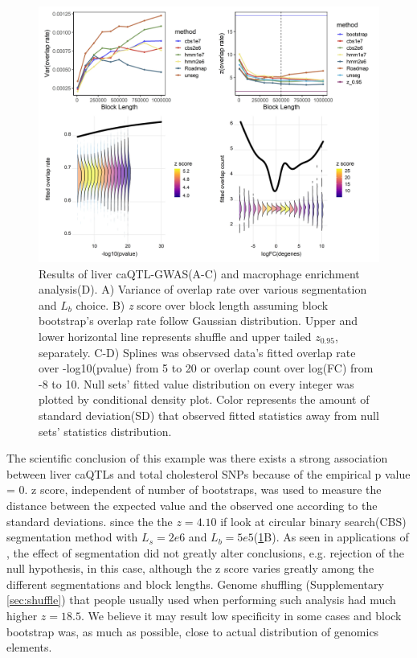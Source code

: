 \begin{figure}[hbtp]
\centering%
\setlength{\abovecaptionskip}{-0.1cm}
\setlength{\belowcaptionskip}{-0.1cm}
\includegraphics[scale=0.25]{Figures/fig2.jpeg}
\caption{Results of liver caQTL-GWAS(A-C) and macrophage enrichment analysis(D). A) Variance of overlap rate over various segmentation and $L_b$ choice. B) {\it z} score over block length assuming block bootstrap's overlap rate follow Gaussian distribution. Upper and lower horizontal line represents shuffle and upper tailed $z_{0.95}$, separately. C-D) Splines was observsed data's fitted overlap rate over -log10(pvalue) from 5 to 20 or overlap count over log(FC) from -8 to 10. Null sets' fitted value distribution on every integer was plotted by conditional density plot. Color represents the amount of standard deviation(SD) that observed fitted statistics away from null sets' statistics distribution. }
\label{fig:result}
\vspace{-1.2cm}
\end{figure}

The scientific conclusion of this example was there exists a strong association between liver caQTLs and total cholesterol SNPs because of the empirical p value = 0. z score, independent of number of bootstraps, was used to measure the distance between the expected value and the observed one according to the standard deviations.
since the the $z = 4.10$ if look at circular binary search(CBS) \citep{cbs} segmentation method with $L_s = 2e6$ and $L_b=5e5$(\cref{fig:result}B). 
As seen in applications of \citet{bickel2010subsampling}, the effect of segmentation did not greatly alter conclusions, e.g. rejection of the null hypothesis, in this case, although the z score varies greatly among the different segmentations and block lengths.
Genome shuffling (Supplementary \cref{sec:shuffle}) that people usually used when performing such analysis had much higher $z = 18.5$. We believe it may result low specificity in some cases and block bootstrap was, as much as possible, close to actual distribution of genomics elements. 

